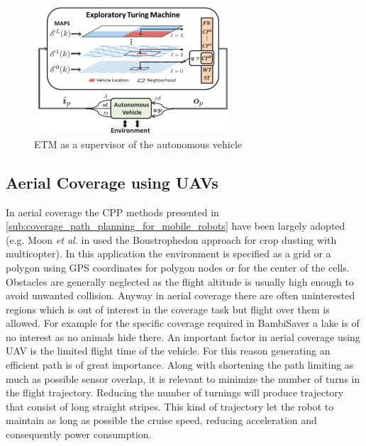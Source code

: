\begin{figure}[ht]
    \centering
    \includegraphics[width=0.65\textwidth]{figures/C3/ETM-online-CPP.png}
    \caption{ETM as a supervisor of the autonomous vehicle \cite{8286947}}
    \label{fig:ETM-online-CPP}
\end{figure}


\subsection{Aerial Coverage using UAVs} %
\label{sub:aerial_coverage_using_uavs}
In aerial coverage the CPP methods presented in \autoref{sub:coverage_path_planning_for_mobile_robots} have been largely adopted (e.g. Moon \textit{et al.} in \cite{HGJHC0_2009_v10n2_1} used the Boustrophedon approach for crop dusting with multicopter). In this application the environment is specified as a grid or a polygon using GPS coordinates for polygon nodes or for the center of the cells. Obstacles are generally neglected as the flight altitude is usually high enough to avoid unwanted collision. Anyway in aerial coverage there are often uninterested regions which is out of interest in the coverage task but flight over them is allowed. For example for the specific coverage required in BambiSaver a lake is of no interest as no animals hide there. An important factor in aerial coverage using UAV is the limited flight time of the vehicle. For this reason generating an efficient path is of great importance. Along with shortening the path limiting as much as possible sensor overlap, it is relevant to minimize the number of turns in the flight trajectory. Reducing the number of turnings will produce trajectory that consist of long straight stripes. This kind of trajectory let the robot to maintain as long as possible the cruise speed, reducing acceleration and consequently power consumption.

